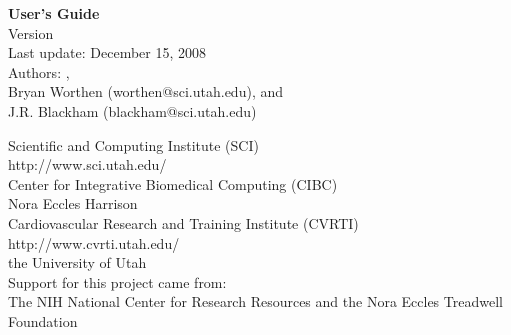   \mbox{}
  \vspace{2in}
\begin{center}
   {\huge\bf \map{} User's Guide}\\
   \vspace{.5in}
   {\Large Version \version{}\\
   \medskip
   Last update: December 15, 2008 \\}
   \bigskip
   {\Large Authors: \rob{}, \\
   Bryan Worthen (worthen@sci.utah.edu), and \\
   J.R. Blackham (blackham@sci.utah.edu)}
   \bigskip

   {\Large 
   \medskip
   Scientific and Computing Institute (SCI)\\
   {http://www.sci.utah.edu/}\\
   \medskip
   Center for Integrative Biomedical Computing (CIBC)
   \\
   \medskip
   Nora Eccles Harrison \\
   Cardiovascular Research and Training Institute (CVRTI)\\
   {http://www.cvrti.utah.edu/}\\
   \medskip
   the University of Utah}\\

   \bigskip
   Support for this project came from:\\
   \medskip
   {\Large The NIH National Center for Research Resources  
    and the Nora
   Eccles Treadwell Foundation\\ 
   \smallskip
   }

\end{center}

